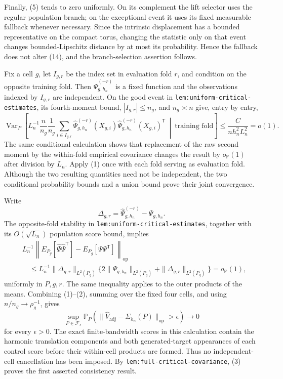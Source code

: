 Finally, (5) tends to zero uniformly.  On its complement the lift selector uses the regular population branch; on the exceptional event it uses its fixed measurable fallback whenever necessary.  Since the intrinsic displacement has a bounded representative on the compact torus, changing the statistic only on that event changes bounded-Lipschitz distance by at most its probability.  Hence the fallback does not alter (14), and the branch-selection assertion follows.

Fix a cell \(g\), let \(I_{g,r}\) be the index set in evaluation fold \(r\), and condition on the opposite training fold.  Then \(\widehat\Psi_{g,h_n}^{(-r)}\) is a fixed function and the observations indexed by \(I_{g,r}\) are independent.  On the good event in \texttt{lem:uniform-critical-estimates}, its fourth-moment bound, \(|I_{g,r}|\leq n_g\), and \(n_g\asymp n\) give, entry by entry,
\[
 \operatorname{Var}_P\!\left[
 L_n^{-1}\frac n{n_g}\frac1{n_g}
 \sum_{i\in I_{g,r}}
 \widehat\Psi_{g,h_n}^{(-r)}(X_{g,i})
 \widehat\Psi_{g,h_n}^{(-r)}(X_{g,i})^{\mathsf T}
 \ \middle|\ \text{training fold}\right]
 \leq\frac{C}{nh_n^2L_n^2}=o(1).                                     \tag{1}
\]
The same conditional calculation shows that replacement of the raw second moment by the within-fold empirical covariance changes the result by \(o_{\mathbb P}(1)\) after division by \(L_n\).  Apply (1) once with each fold serving as evaluation fold.  Although the two resulting quantities need not be independent, the two conditional probability bounds and a union bound prove their joint convergence.

Write
\[
 \Delta_{g,r}=\widehat\Psi_{g,h_n}^{(-r)}-\Psi_{g,h_n}.
\]
The opposite-fold stability in \texttt{lem:uniform-critical-estimates}, together with its \(O(\sqrt{L_n})\) population score bound, implies
\[
 \begin{aligned}
 &L_n^{-1}\left\|
 E_{P_g}[\widehat\Psi\widehat\Psi^{\mathsf T}]
 -E_{P_g}[\Psi\Psi^{\mathsf T}]
 \right\|_{\mathrm{op}}\\
 &\quad\leq L_n^{-1}\|\Delta_{g,r}\|_{L^2(P_g)}
 \{2\|\Psi_{g,h_n}\|_{L^2(P_g)}+\|\Delta_{g,r}\|_{L^2(P_g)}\}
 =o_{\mathbb P}(1),                                                    \tag{2}
 \end{aligned}
\]
uniformly in \(P,g,r\).  The same inequality applies to the outer products of the means.  Combining (1)--(2), summing over the fixed four cells, and using \(n/n_g\to\rho_g^{-1}\), gives
\[
 \sup_{P\in\mathcal F_s}
 \mathbb P_P\!\left(
 \|\widehat V_{\mathrm{adj}}-\Sigma_{h_n}(P)\|_{\mathrm{op}}>\epsilon
 \right)\longrightarrow0                                             \tag{3}
\]
for every \(\epsilon>0\).  The exact finite-bandwidth scores in this calculation contain the harmonic translation components and both generated-target appearances of each control score before their within-cell products are formed.  Thus no independent-cell cancellation has been imposed.  By \texttt{lem:full-critical-covariance}, (3) proves the first asserted consistency result.

